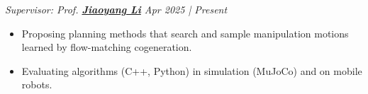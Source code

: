 \documentclass[a4paper,9pt]{extarticle}
\begin{document}
\par\textit{Supervisor: Prof. {\href{https://jiaoyangli.me/}{\textbf{Jiaoyang Li}}} \hfill Apr 2025 | Present}  %
\begin{itemize}
    \item Proposing planning methods that search and sample manipulation motions learned by flow-matching cogeneration. 
    \item Evaluating algorithms (C++, Python) in simulation (MuJoCo) and on mobile robots.
\end{itemize}
\end{document}
